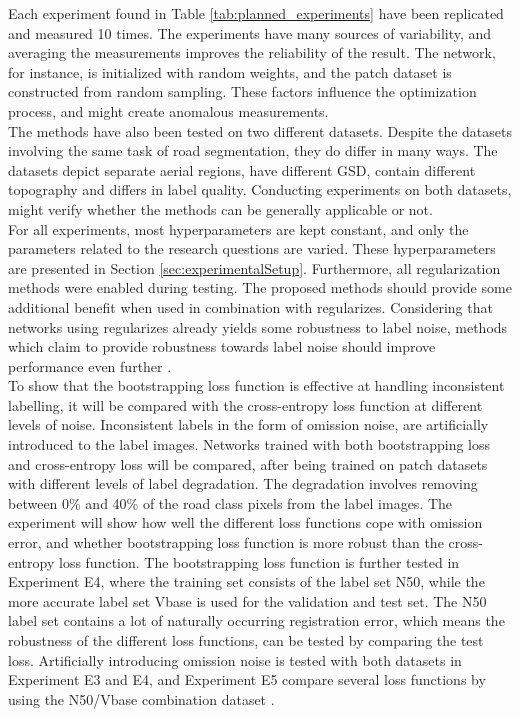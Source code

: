 Each experiment found in Table \ref{tab:planned_experiments} have been replicated and measured 10 times. The experiments have many sources of variability, and averaging the measurements improves the reliability of the result. The network, for instance, is initialized with random weights, and the patch dataset is constructed from random sampling. These factors influence the optimization process, and might create anomalous measurements.\\

The methods have also been tested on two different datasets. Despite the datasets involving the same task of road segmentation, they do differ in many ways. The datasets depict separate aerial regions, have different \ac{GSD}, contain different topography and differs in label quality. Conducting experiments on both datasets, might verify whether the methods can be generally applicable or not.\\

For all experiments, most hyperparameters are kept constant, and only the parameters related to the research questions are varied. These hyperparameters are presented in Section \ref{sec:experimentalSetup}. Furthermore, all regularization methods were enabled during testing. The proposed methods should provide some additional benefit when used in combination with regularizes. Considering that networks using regularizes already yields some robustness to label noise, methods which claim to provide robustness towards label noise should improve performance even further .  \\

To show that the bootstrapping loss function is effective at handling inconsistent labelling, it will be compared with the cross-entropy loss function at different levels of noise. Inconsistent labels in the form of omission noise, are artificially introduced to the label images. Networks trained with both bootstrapping loss and cross-entropy loss will be compared, after being trained on patch datasets with different levels of label degradation. The degradation involves removing between 0\% and 40\% of the road class pixels from the label images. The experiment will show how well the different loss functions cope with omission error, and whether bootstrapping loss function is more robust than the cross-entropy loss function. The bootstrapping loss function is further tested in Experiment E4, where the training set consists of the label set N50, while the more accurate label set Vbase is used for the validation and test set. The N50 label set contains a lot of naturally occurring registration error, which means the robustness of the different loss functions, can be tested by comparing the test loss. Artificially introducing omission noise is tested with both datasets in Experiment E3 and E4, and Experiment E5 compare several loss functions by using the N50/Vbase combination dataset . \\

